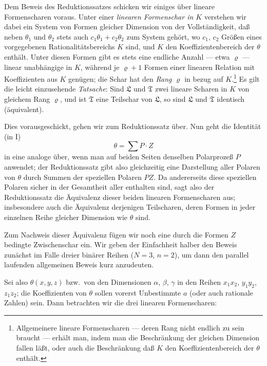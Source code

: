 \documentclass[12pt,a4paper]{article}
\begin{document}
Dem Beweis des Reduktionssatzes schicken wir einiges \"uber lineare Formenscharen voraus. Unter einer \emph{linearen Formenschar in $K$} verstehen wir dabei ein System von Formen gleicher Dimension von der Vollst\"andigkeit, da\ss{} neben $\theta_1$ und $\theta_2$ stets auch $c_1\theta_1 + c_2\theta_2$ zum System geh\"ort, wo $c_1$, $c_2$ Gr\"o\ss en eines vorgegebenen Rationalit\"atsbereichs $K$ sind, und $K$ den Koeffizientenbereich der $\theta$ enth\"alt. Unter diesen Formen gibt es stets eine endliche Anzahl --- etwa $\varrho$ --- linear unabh\"angige in $K$, w\"ahrend je $\varrho+1$ Formen einer linearen Relation mit Koeffizienten aus $K$ gen\"ugen; die Schar hat den \emph{Rang $\varrho$} in bezug auf $K$.\footnote{Allgemeinere lineare Formenscharen --- deren Rang nicht endlich zu sein braucht --- erh\"alt man, indem man die Beschr\"ankung der gleichen Dimension fallen l\"a\ss t, oder auch die Beschr\"ankung da\ss{} $K$ den Koeffizientenbereich der $\theta$ enth\"alt.} Es gilt die leicht einzusehende \emph{Tatsache}: Sind $\mathfrak{L}$ und $\mathfrak{T}$ zwei lineare Scharen in $K$ von gleichem Rang $\varrho$, und ist $\mathfrak{T}$ eine Teilschar von $\mathfrak{L}$, so sind $\mathfrak{L}$ und $\mathfrak{T}$ identisch (\"aquivalent).

Dies vorausgeschickt, gehen wir zum Reduktionssatz \"uber. Nun geht die Identit\"at (in I)
\begin{equation}\tag{1}
\theta = \sum P \cdot Z
\end{equation}
in eine analoge \"uber, wenn man auf beiden Seiten denselben Polarproze\ss{} $P$ anwendet; der Reduktionssatz gibt also gleichzeitig eine Darstellung aller Polaren von $\theta$ durch Summen der speziellen Polaren $PZ$. Da andererseits diese speziellen Polaren sicher in der Gesamtheit aller enthalten sind, sagt also der Reduktionssatz die Äquivalenz dieser beiden linearen Formenscharen aus; insbesondere auch die Äquivalenz derjenigen Teilscharen, deren Formen in jeder einzelnen Reihe gleicher Dimension wie $\theta$ sind.

Zum Nachweis dieser Äquivalenz f\"ugen wir noch eine durch die Formen $Z$ bedingte Zwischenschar ein. Wir geben der Einfachheit halber den Beweis zun\"achst im Falle dreier bin\"arer Reihen ($N=3$, $n=2$), um dann den parallel laufenden allgemeinen Beweis kurz anzudeuten.

Sei also $\theta(x, y, z)$ bzw.\ von den Dimensionen $\alpha$, $\beta$, $\gamma$ in den Reihen $x_1x_2$, $y_1y_2$, $z_1z_2$; die Koeffizienten von $\theta$ sollen vorerst Unbestimmte $a$ (oder auch rationale Zahlen) sein. Dann betrachten wir die drei linearen Formenscharen:
\end{document}
